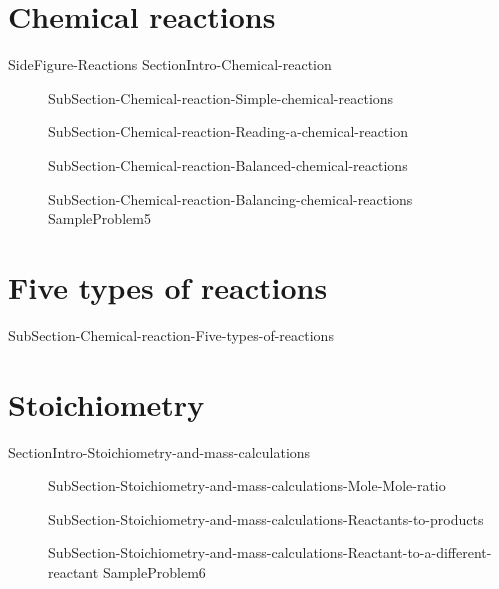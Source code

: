 \documentclass[main.tex]{subfiles}
\newcommand\chapterlabel{Ch-mole}\setcounter{figurenewcounter}{0}\setcounter{tablenewcounter}{0}\setcounter{formulanewcounter}{0}\chapterpicture{../{\chapterlabel}/figure1}\chapterpicturelabel{PngImg}
\begin{document}
\section{Chemical reactions}
 {SideFigure-Reactions}
{SectionIntro-Chemical-reaction}
\sloppy\begin{description}
\item[] {SubSection-Chemical-reaction-Simple-chemical-reactions}
\item[]{SubSection-Chemical-reaction-Reading-a-chemical-reaction}
\item[]{SubSection-Chemical-reaction-Balanced-chemical-reactions}
\item[]{SubSection-Chemical-reaction-Balancing-chemical-reactions}
{SampleProblem5}
\end{description}


\section{Five types of reactions}
{SubSection-Chemical-reaction-Five-types-of-reactions}



\section{Stoichiometry}
{SectionIntro-Stoichiometry-and-mass-calculations}
\sloppy \begin{description}
\item[]{SubSection-Stoichiometry-and-mass-calculations-Mole-Mole-ratio}
\item[]{SubSection-Stoichiometry-and-mass-calculations-Reactants-to-products}
\item[] {SubSection-Stoichiometry-and-mass-calculations-Reactant-to-a-different-reactant}
{SampleProblem6}
\end{description}
\end{document}
